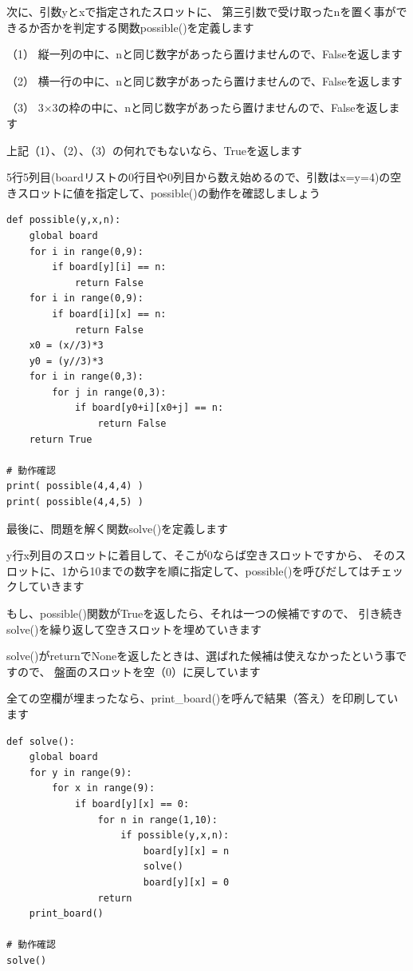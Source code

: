 \documentclass[uplatex,a4paper,11pt,oneside,openany]{jsbook}
\begin{document}
次に、引数yとxで指定されたスロットに、
第三引数で受け取ったnを置く事ができるか否かを判定する関数possible()を定義します

（1） 縦一列の中に、nと同じ数字があったら置けませんので、Falseを返します

（2） 横一行の中に、nと同じ数字があったら置けませんので、Falseを返します

（3） 3$\times$3の枠の中に、nと同じ数字があったら置けませんので、Falseを返します

上記（1）、（2）、（3）の何れでもないなら、Trueを返します

5行5列目(boardリストの0行目や0列目から数え始めるので、引数はx=y=4)の空きスロットに値を指定して、possible()の動作を確認しましょう

\begin{lstlisting}[caption=possible,label=sudoku02]
def possible(y,x,n):
    global board
    for i in range(0,9):
        if board[y][i] == n:
            return False
    for i in range(0,9):
        if board[i][x] == n:
            return False
    x0 = (x//3)*3
    y0 = (y//3)*3
    for i in range(0,3):
        for j in range(0,3):
            if board[y0+i][x0+j] == n:
                return False
    return True

# 動作確認
print( possible(4,4,4) )
print( possible(4,4,5) )
\end{lstlisting}

最後に、問題を解く関数solve()を定義します

y行x列目のスロットに着目して、そこが0ならば空きスロットですから、
そのスロットに、1から10までの数字を順に指定して、possible()を呼びだしてはチェックしていきます

もし、possible()関数がTrueを返したら、それは一つの候補ですので、
引き続きsolve()を繰り返して空きスロットを埋めていきます

solve()がreturnでNoneを返したときは、選ばれた候補は使えなかったという事ですので、
盤面のスロットを空（0）に戻しています

全ての空欄が埋まったなら、print\_board()を呼んで結果（答え）を印刷しています

\begin{lstlisting}[caption=solve,label=sudoku03]
def solve():
    global board
    for y in range(9):
        for x in range(9):
            if board[y][x] == 0:
                for n in range(1,10):
                    if possible(y,x,n):
                        board[y][x] = n
                        solve()
                        board[y][x] = 0
                return
    print_board()

# 動作確認
solve()
\end{lstlisting}
\end{document}
